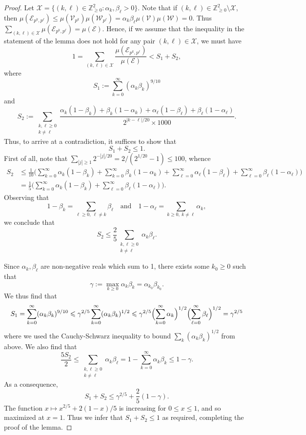 \documentclass[12pt]{amsart}
\numberwithin{equation}{section}
\theoremstyle{definition}
\theoremstyle{remark}
\newcommand{\Z}{\mathbb{Z}}
\newcommand{\CE}{\mathcal{E}}
\newcommand{\CV}{\mathcal{V}}
\newcommand{\CW}{\mathcal{W}}
\newcommand{\CX}{\mathcal{X}}
\renewcommand{\le}{\leqslant}
\renewcommand{\ge}{\geqslant}
\begin{document}
\begin{proof} Let $\CX=\{(k,\ell)\in\Z_{\ge0}^2: \alpha_k,\beta_\ell>0\}$. Note that if $(k,\ell)\in\Z_{\ge0}^2\setminus \CX$, then $\mu(\CE_{p^k,p^\ell})\le \mu(\CV_{p^k})\mu(\CW_{p^\ell})=\alpha_k\beta_\ell \mu(\CV)\mu(\CW)=0$. Thus $\sum_{(k,\ell)\in \CX}\mu(\CE_{p^k,p^\ell}) = \mu(\CE)$. Hence, if we assume that the inequality in the statement of the lemma does not hold for any pair $(k,\ell)\in \CX$, we must have
\[
1=\sum_{(k,\ell)\in\CX}\frac{\mu(\CE_{p^k,p^\ell})}{\mu(\CE)}< S_1+S_2,
\]
	where
	\[
	S_1:=\sum_{k=0}^\infty(\alpha_k\beta_k)^{9/10}
	\]
	and
	\[
	S_2:=\sum_{\substack{k,\ell\ge0\\ k\neq\ell}}
		\frac{\alpha_k(1-\beta_k)
			+\beta_k(1-\alpha_k)
			+\alpha_\ell(1-\beta_\ell)
			+\beta_\ell(1-\alpha_\ell)}{2^{|k-\ell|/20}\times 1000}.
	\]
Thus, to arrive at a contradiction, it suffices to show that
	\[
	S_1+S_2\le 1.
	\]
First of all, note that $\sum_{|j|\ge1}2^{-|j|/20}=2/(2^{1/20}-1)\le 100$, whence	
\begin{align*}
S_2&\le 
	\frac{1}{10}
		\bigg(\sum_{k=0}^\infty\alpha_k(1-\beta_k)
		+\sum_{k=0}^\infty\beta_k(1-\alpha_k)
		+\sum_{\ell=0}^\infty\alpha_\ell(1-\beta_\ell)
		+\sum_{\ell=0}^\infty\beta_\ell(1-\alpha_\ell)\bigg) \\
	&=\frac{1}{5}\bigg(\sum_{k=0}^\infty\alpha_k(1-\beta_k)
		+ \sum_{\ell=0}^\infty\beta_\ell(1-\alpha_\ell)\bigg).
\end{align*}
Observing that 
\[
1-\beta_k=\sum_{\ell\ge0,\ \ell\neq k} \beta_\ell
\quad\text{and}\quad
1-\alpha_\ell=\sum_{k\ge0,\ k\neq \ell} \alpha_k,
\]
we conclude that
\[
S_2\le \frac{2}{5}\sum_{\substack{k,\ell\ge0\\ k\neq\ell}} \alpha_k\beta_\ell.
\]

Since $\alpha_k,\beta_\ell$ are non-negative reals which sum to 1, there exists some $k_0\ge0$ such that 
\[
\gamma:=\max_{k\ge0}\alpha_k\beta_k= \alpha_{k_0}\beta_{k_0}.
\]
We thus find that 
\[
S_1 = \sum_{k=0}^\infty(\alpha_k\beta_k)^{9/10}\le \gamma^{2/5}\sum_{k=0}^\infty(\alpha_k\beta_k)^{1/2}\le \gamma^{2/5}\Bigl(\sum_{k=0}^\infty \alpha_k\Bigr)^{1/2}\Bigl(\sum_{\ell=0}^{\infty}\beta_\ell\Bigr)^{1/2}= \gamma^{2/5}
\]
where we used the Cauchy-Schwarz inequality to bound $\sum_k (\alpha_k\beta_k)^{1/2}$ from above. 
We also find that
\[
\frac{5 S_2}{2}\le \sum_{\substack{k,\ell\ge0\\ k\neq\ell}} \alpha_k\beta_\ell
	= 1- \sum_{k=0}^\infty \alpha_k\beta_k
	\le 1-\gamma.
\]
As a consequence, 
\[
S_1+S_2\le \gamma^{2/5}+\frac{2}{5}(1-\gamma).
\]
The function $x\mapsto x^{2/5}+2(1-x)/5$ is increasing for $0\le x\le1$, and so maximized at $x=1$. Thus we infer that $S_1+S_2\le1$ as required, completing the proof of the lemma.
\end{proof}
\end{document}

